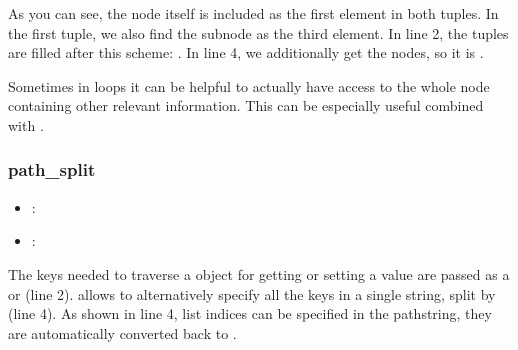 \documentclass[a4paper,10pt,english]{sphinxmanual}
\begin{document}
\sphinxAtStartPar
As you can see, the node itself is included as the first element in both tuples. In the first tuple, we also find the subnode  as the third element. In line 2, the tuples are filled after this scheme: . In line 4, we additionally get the nodes, so it is .

\sphinxAtStartPar
Sometimes in loops it can be helpful to actually have access to the whole node containing other relevant information. This can be especially useful combined with {\hyperref[\detokenize{README:skipping-nodes-in-iteration}]{}}.


\subsubsection{path\_split}
\label{\detokenize{README:path-split}}\begin{itemize}
\item {}
\sphinxAtStartPar
{}: 

\item {}
\sphinxAtStartPar
{}: 

\end{itemize}

\sphinxAtStartPar
The keys needed to traverse a \sphinxhyphen{}object for getting or setting a value are passed as a  or  (line 2).  allows to alternatively specify all the keys in a single string, split by  (line 4). As shown in line 4, list indices can be specified in the path\sphinxhyphen{}string, they are automatically converted back to .

\begin{sphinxVerbatim}[commandchars=\\\{\},numbers=left,firstnumber=1,stepnumber=1]
    \PYG{p}{[} \PYG{p}{]}
\PYG{p}{[}  \PYG{p}{]}
\PYG{p}{[}\PYG{p}{]}
\end{sphinxVerbatim}
\end{document}

